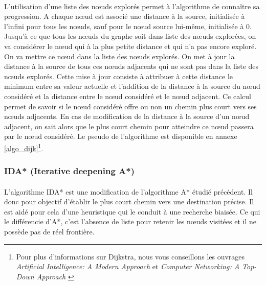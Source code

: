 \documentclass[pidr]{tnreport}
\begin{document}
\paragraph{}
L'utilisation d'une liste des nœuds explorés permet à l'algorithme de connaître sa progression. A chaque nœud est associé une distance à la source, initialisée à l'infini pour tous les nœuds, sauf pour le nœud source lui-même, initialisée à 0. Jusqu'à ce que tous les nœuds du graphe soit dans liste des nœuds explorées, on va considérer le nœud qui à la plus petite distance et qui n'a pas encore exploré. On va mettre ce nœud dans la liste des nœuds explorés. On met à jour la distance à la source de tous ces nœuds adjacents qui ne sont pas dans la liste des nœuds explorés. Cette mise à jour consiste à attribuer à cette distance le minimum entre sa valeur actuelle et l'addition de la distance à la source du nœud considéré et la distance entre le nœud considéré et le nœud adjacent. Ce calcul permet de savoir si le nœud considéré offre ou non un chemin plus court vers ses nœuds adjacents. En cas de modification de la distance à la source d'un nœud adjacent, on sait alors que le plus court chemin pour atteindre ce nœud passera par le nœud considéré.   
\newline\newline
Le pseudo de l'algorithme est disponible en annexe \ref{algo_dijk}\footnote{Pour plus d'informations sur Dijkstra, nous vous conseillons les ouvrages \textit{Artificial Intelligence: A Modern Approach} \cite{AIMA} et \textit{Computer Networking: A Top-Down Approach} \cite{Kurose}}. \newline

			\subsubsection{IDA* (Iterative deepening A*)}
\paragraph{}
L'algorithme IDA* est une modification de l'algorithme A* étudié précédent. Il donc pour objectif d'établir le plus court chemin vers une destination précise. Il est aidé pour cela d'une heuristique qui le conduit à une recherche biaisée. Ce qui le différencie d'A*, c'est l'absence de liste pour retenir les nœuds visitées et il ne possède pas de réel frontière. 
\end{document}
